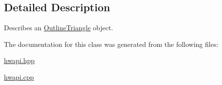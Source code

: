 \subsection{Detailed Description}
Describes an \mbox{\hyperlink{classdummy__api_1_1OutlineTriangle}{Outline\+Triangle}} object. 

The documentation for this class was generated from the following files\+:\begin{DoxyCompactItemize}
\item 
\mbox{\hyperlink{hwapi_8hpp}{hwapi.\+hpp}}\item 
\mbox{\hyperlink{hwapi_8cpp}{hwapi.\+cpp}}\end{DoxyCompactItemize}
